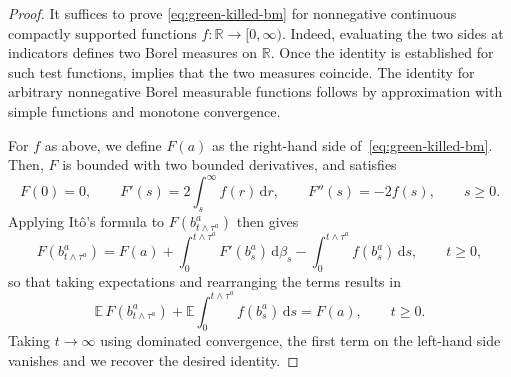 \documentclass[11pt]{amsart}
\theoremstyle{definition}
\theoremstyle{remark}
\numberwithin{equation}{section}
\newcommand{\E}{\mathbb E}
\newcommand{\R}{\mathbb R}
\newcommand{\1}{\mathbf 1}
\newcommand{\dd}{\,\mathrm d}
\begin{document}
\begin{proof}
It suffices to prove \eqref{eq:green-killed-bm} for nonnegative
continuous compactly supported functions $f:\R\to[0,\infty)$.
Indeed, evaluating the two sides at indicators defines two Borel
measures on $\R$. Once the identity is established for such test
functions,  \cite[Theorem~2.25]{Kallenberg2021} implies that the two measures coincide. The identity for arbitrary nonnegative Borel measurable
functions follows by approximation with simple functions and
monotone convergence.

For $f$ as above, we define $F(a)$ as the right-hand side of~\eqref{eq:green-killed-bm}.
Then, $F$ is bounded with two bounded derivatives, and satisfies
\[
    F(0)=0,
    \qquad
    F'(s)=2\int_s^\infty f(r)\dd r,
    \qquad
    F''(s)=-2f(s), \qquad s \geq 0.
\]
Applying It\^o's formula to $F(b^a_{t \wedge \tau^a})$ then gives
\begin{equation*}
F(b^a_{t \wedge \tau^a}) = F(a) + \int_0^{t \wedge \tau^a} F'(b^a_s) \dd \beta_s - \int_0^{t \wedge \tau^a}f(b^a_s) \dd s, \qquad t \geq 0,
\end{equation*}
so that taking expectations and rearranging the terms results in
\begin{equation*}
    \E \, F(b^a_{t \wedge \tau^a}) + \E \int_0^{t \wedge \tau^a} f(b^a_s) \dd s = F(a) , \qquad t \geq 0.
\end{equation*}
Taking $t \to \infty$ using dominated convergence, the first term on the left-hand side vanishes and we recover the desired identity.
\end{proof}
\end{document}

